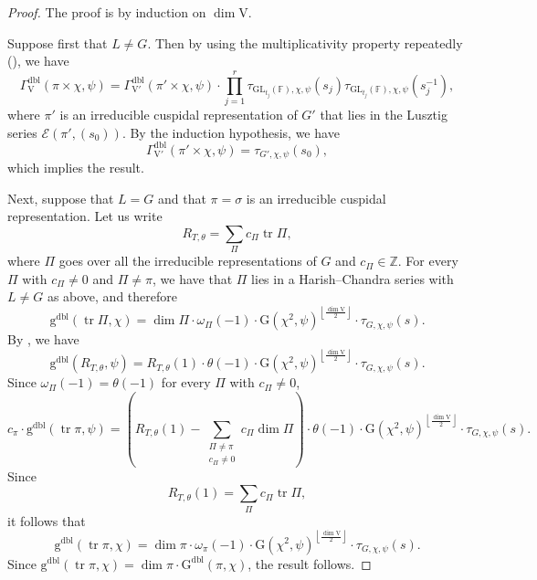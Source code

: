 \documentclass[12pt, reqno]{amsart}
\theoremstyle{definition}
\theoremstyle{definition}
\theoremstyle{definition}
\newcommand{\zIntegers}{\mathbb{Z}}
\newcommand{\hermitianSpace}{\mathrm{V}}
\newcommand{\fieldCharacter}{\psi}
\newcommand{\centralCharacter}[1]{\omega_{#1}}
\newcommand{\trace}{\operatorname{tr}}
\newcommand{\GL}{\mathrm{GL}}
\newcommand{\finiteField}{\mathbb{F}}
\newcommand{\GaussSumScalar}[2]{\mathrm{G}\left(#1, #2\right)}
\newcommand{\dblGaussSumScalar}[2]{\mathrm{G}^{\mathrm{dbl}}\left(#1, #2\right)}
\newcommand{\dblVirtualGaussSumScalar}[2]{\mathrm{g}^{\mathrm{dbl}}\left(#1, #2\right)}
\newcommand{\dblGammaFactorSpace}[4]{\Gamma^{\mathrm{dbl}}_{#1}\left(#2 \times #3, #4\right)}
\newcommand{\LusztigSeries}[2]{\mathcal{E}\left(#1, (#2)\right)}
\begin{document}
\begin{proof}
	The proof is by induction on $\dim \hermitianSpace$.
	
	Suppose first that $L \ne G$. Then by using the multiplicativity property repeatedly (), we have $$\dblGammaFactorSpace{\hermitianSpace}{\pi}{\chi}{\fieldCharacter} = \dblGammaFactorSpace{\hermitianSpace'}{\pi'}{\chi}{\fieldCharacter} \cdot \prod_{j=1}^r \tau_{\GL_{t_j}\left(\finiteField\right), \chi, \fieldCharacter}\left(s_j\right) \tau_{\GL_{t_j}\left(\finiteField\right), \chi, \fieldCharacter}\left(s_j^{-1}\right),$$
	where $\pi'$ is an irreducible cuspidal representation of $G'$ that lies in the Lusztig series $\LusztigSeries{\pi'}{s_0}$. By the induction hypothesis, we have $$\dblGammaFactorSpace{\hermitianSpace'}{\pi'}{\chi}{\fieldCharacter} = \tau_{G', \chi, \fieldCharacter}\left(s_0\right),$$
	which implies the result.
	
	Next, suppose that $L = G$ and that $\pi = \sigma$ is an irreducible cuspidal representation. Let us write $$R_{T, \theta} = \sum_{\Pi} c_\Pi \trace \Pi,$$
	where $\Pi$ goes over all the irreducible representations of $G$ and $c_{\Pi} \in \zIntegers$. For every $\Pi$ with $c_{\Pi} \ne 0$ and $\Pi \ne \pi$, we have that $\Pi$ lies in a Harish--Chandra series with $L \ne G$ as above, and therefore $$\dblVirtualGaussSumScalar{\trace \Pi}{\chi} = \dim \Pi \cdot \centralCharacter{\Pi}\left(-1\right) \cdot \GaussSumScalar{\chi^2}{\fieldCharacter}^{\left\lfloor\frac{\dim \hermitianSpace}{2}\right\rfloor} \cdot \tau_{G, \chi, \fieldCharacter}\left(s\right).$$
	By , we have $$\dblVirtualGaussSumScalar{R_{T,\theta}}{\fieldCharacter} = R_{T,\theta}\left(1\right) \cdot \theta\left(-1\right) \cdot \GaussSumScalar{\chi^2}{\fieldCharacter}^{\left\lfloor\frac{\dim \hermitianSpace}{2}\right\rfloor} \cdot \tau_{G, \chi, \fieldCharacter}\left(s\right).$$
	Since $\centralCharacter{\Pi}\left(-1\right) = \theta\left(-1\right)$ for every $\Pi$ with $c_{\Pi} \ne 0$,
	$$c_{\pi} \cdot \dblVirtualGaussSumScalar{\trace \pi}{\fieldCharacter} = \left(R_{T,\theta}\left(1\right) - \sum_{\substack{\Pi \ne \pi\\
	c_{\Pi} \ne 0}} c_{\Pi} \dim \Pi\right) \cdot \theta\left(-1\right) \cdot \GaussSumScalar{\chi^2}{\fieldCharacter}^{\left\lfloor\frac{\dim \hermitianSpace}{2}\right\rfloor} \cdot \tau_{G, \chi, \fieldCharacter}\left(s\right).$$
	Since $$R_{T,\theta}\left(1\right) = \sum_{\Pi} c_{\Pi} \trace \Pi,$$ it follows that $$\dblVirtualGaussSumScalar{\trace \pi}{\chi} = \dim \pi \cdot \centralCharacter{\pi}\left(-1\right) \cdot \GaussSumScalar{\chi^2}{\fieldCharacter}^{\left\lfloor\frac{\dim \hermitianSpace}{2}\right\rfloor} \cdot \tau_{G, \chi, \fieldCharacter}\left(s\right).$$
	Since $\dblVirtualGaussSumScalar{\trace \pi}{\chi} = \dim \pi \cdot \dblGaussSumScalar{\pi}{\chi}$, the result follows.
\end{proof}
\end{document}
